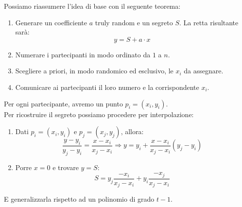 Possiamo riassumere l'idea di base con il seguente teorema:
\begin{theorem}\label{thm:rectsecret}
\begin{enumerate}
\item Generare un coefficiente $a$ truly random e un segreto $S$. La retta risultante sarà: \[y=S+a\cdot x\]
    \item Numerare i partecipanti in modo ordinato da $1$ a $n$.
    \item Scegliere a priori, in modo randomico ed esclusivo, le $x_i$ da assegnare.
    \item Comunicare ai partecipanti il loro numero e la corrispondente $x_i$.
\end{enumerate}
Per ogni partecipante, avremo un punto $p_i=(x_i,y_i)$.\footnotemark\\
Per ricostruire il segreto possiamo procedere per interpolazione:
\begin{enumerate}
    \item Dati $p_i=(x_i,y_i)$ e $p_j=(x_j,y_j)$, allora:
    \[\frac{y-y_i}{y_j-y_i}=\frac{x-x_i}{x_j-x_i}\Longrightarrow y=y_i+\frac{x-x_i}{x_j-x_i}(y_j-y_i)\]
    \item Porre $x=0$ e trovare $y=S$:\footnotemark
    \[S=y_j\frac{-x_i}{x_j-x_i}+y_i\frac{-x_j}{x_j-x_i}\]
\end{enumerate}
\end{theorem}
E generalizzarla rispetto ad un polinomio di grado $t-1$.


